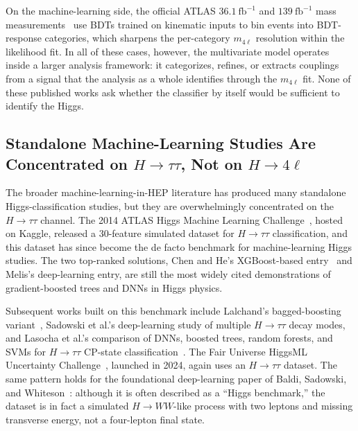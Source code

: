 \documentclass[conference]{IEEEtran}
\begin{document}
{On the machine-learning side, the official ATLAS $36.1~\mathrm{fb}^{-1}$ and $139~\mathrm{fb}^{-1}$ mass measurements~\cite{atlas2018higgsmass,atlas2023run2mass} use BDTs trained on kinematic inputs to bin events into BDT-response categories, which sharpens the per-category $m_{4\ell}$ resolution within the likelihood fit. In all of these cases, however, the multivariate model operates inside a larger analysis framework: it categorizes, refines, or extracts couplings from a signal that the analysis as a whole identifies through the $m_{4\ell}$ fit. None of these published works ask whether the classifier by itself would be sufficient to identify the Higgs.

\subsection{Standalone Machine-Learning Studies Are Concentrated on $H \to \tau\tau$, Not on $H \to 4\ell$}

 
The broader machine-learning-in-HEP literature has produced many standalone Higgs-classification studies, but they are overwhelmingly concentrated on the $H \rightarrow \tau\tau$ channel. The 2014 ATLAS Higgs Machine Learning Challenge~\cite{adambourdarios2015higgsml}, hosted on Kaggle, released a 30-feature simulated dataset for $H \rightarrow \tau\tau$ classification, and this dataset has since become the de facto benchmark for machine-learning Higgs studies. The two top-ranked solutions, Chen and He's XGBoost-based entry~\cite{chen2015higgsxgb} and Melis's deep-learning entry, are still the most widely cited demonstrations of gradient-boosted trees and DNNs in Higgs physics.
 
Subsequent works built on this benchmark include Lalchand's bagged-boosting variant~\cite{lalchand2020bdt}, Sadowski et al.'s deep-learning study of multiple $H \rightarrow \tau\tau$ decay modes, and Lasocha et al.'s comparison of DNNs, boosted trees, random forests, and SVMs for $H \rightarrow \tau\tau$ CP-state classification~\cite{lasocha2018cp}. The Fair Universe HiggsML Uncertainty Challenge~\cite{bhimji2024fairuniverse}, launched in 2024, again uses an $H \rightarrow \tau\tau$ dataset. The same pattern holds for the foundational deep-learning paper of Baldi, Sadowski, and Whiteson~\cite{baldi2014deeplearning}: although it is often described as a ``Higgs benchmark,'' the dataset is in fact a simulated $H \rightarrow WW$-like process with two leptons and missing transverse energy, not a four-lepton final state.
 
}
\end{document}
